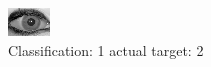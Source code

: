 \begin{figure}[h!]
\begin{center}
\includegraphics[width=0.60\columnwidth]{figures/ID2010_class_1_target_2.png}
\end{center}
\caption{ Classification: 1 actual target: 2}
\label{fig:ID2010_class_1_target_2}
\end{figure}
